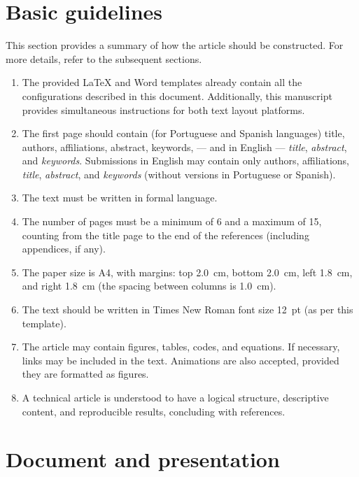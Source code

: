 \section{Basic guidelines}

This section provides a summary of how the article should be constructed. For more details, refer to the subsequent sections.

\vspace{-8pt}
\begin{enumerate} \itemsep=2pt
    \item The provided LaTeX and Word templates already contain all the configurations described in this document. Additionally, this manuscript provides simultaneous instructions for both text layout platforms.
	\item The first page should contain (for Portuguese and Spanish languages) title, authors, affiliations, abstract, keywords, --- and in English --- \textit{title}, \textit{abstract}, and \textit{keywords}. Submissions in English may contain only authors, affiliations, \textit{title}, \textit{abstract}, and \textit{keywords} (without versions in Portuguese or Spanish).
	\item The text must be written in formal language.
	\item The number of pages must be a minimum of 6 and a maximum of 15, counting from the title page to the end of the references (including appendices, if any).
	\item The paper size is A4, with margins: top 2.0~cm, bottom 2.0~cm, left 1.8~cm, and right 1.8~cm (the spacing between columns is 1.0~cm).
	\item The text should be written in Times New Roman font size 12~pt (as per this template).
	\item The article may contain figures, tables, codes, and equations. If necessary, links may be included in the text. Animations are also accepted, provided they are formatted as figures.
	\item A technical article is understood to have a logical structure, descriptive content, and reproducible results, concluding with references.
\end{enumerate}

\section{Document and presentation}

